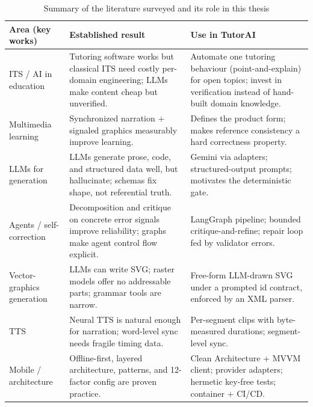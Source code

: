 \begin{table}[htbp]
\caption{Summary of the literature surveyed and its role in this thesis}
\label{tab:litsummary}
\centering
\small
\renewcommand{\arraystretch}{1.3}
\begin{tabular}{@{}p{}p{}p{}@{}}
\toprule
\textbf{Area (key works)} & \textbf{Established result} & \textbf{Use in TutorAI}\\
\midrule
ITS / AI in education
\cite{bloom1984,anderson1995cognitive,vanlehn2011,kasneci2023chatgpt}
& Tutoring software works but classical ITS need costly per-domain
engineering; LLMs make content cheap but unverified.
& Automate one tutoring behaviour (point-and-explain) for open topics;
invest in verification instead of hand-built domain knowledge.\\
Multimedia learning
\cite{paivio1991,sweller1988,mayer2014multimedia,mayermoreno2003}
& Synchronized narration + signaled graphics measurably improve learning.
& Defines the product form; makes reference consistency a hard
correctness property.\\
LLMs for generation
\cite{vaswani2017attention,brown2020gpt3,gemini2023,chen2021codex,liu2023promptsurvey,ji2023hallucination}
& LLMs generate prose, code, and structured data well, but hallucinate;
schemas fix shape, not referential truth.
& Gemini via adapters; structured-output prompts; motivates the
deterministic gate.\\
Agents / self-correction
\cite{wei2022cot,yao2023react,madaan2023selfrefine,shinn2023reflexion,chen2023selfdebug,langchain,langgraph}
& Decomposition and critique on concrete error signals improve
reliability; graphs make agent control flow explicit.
& LangGraph pipeline; bounded critique-and-refine; repair loop fed by
validator errors.\\
Vector-graphics generation
\cite{svgspec,carlier2020deepsvg,rodriguez2023starvector,rombach2022stable}
& LLMs can write SVG; raster models offer no addressable parts; grammar
tools are narrow.
& Free-form LLM-drawn SVG under a prompted id contract, enforced by an
XML parser.\\
TTS \cite{oord2016wavenet,shen2018tacotron2}
& Neural TTS is natural enough for narration; word-level sync needs
fragile timing data.
& Per-segment clips with byte-measured durations; segment-level sync.\\
Mobile / architecture
\cite{offlinefirst,androidguide,martin2017clean,gamma1994,twelvefactor}
& Offline-first, layered architecture, patterns, and 12-factor config are
proven practice.
& Clean Architecture + MVVM client; provider adapters; hermetic key-free
tests; container + CI/CD.\\
\bottomrule
\end{tabular}
\end{table}

